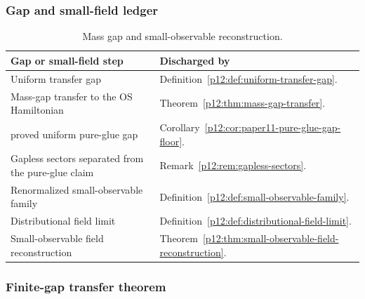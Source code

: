 \documentclass[12pt,a4paper]{article}
\begin{document}
\subsubsection{Gap and small-field ledger}
\label{p12:sec:gap-small-field-ledger}

\begin{table}[htbp]
\centering
\small
\begin{tabularx}{\textwidth}{@{}
>{\raggedright\arraybackslash}p{}
>{\raggedright\arraybackslash}X
@{}}
\toprule
\textbf{Gap or small-field step} & \textbf{Discharged by} \\
\midrule
Uniform transfer gap
& Definition~\ref{p12:def:uniform-transfer-gap}. \\

Mass-gap transfer to the OS Hamiltonian
& Theorem~\ref{p12:thm:mass-gap-transfer}. \\

proved uniform pure-glue gap
& Corollary~\ref{p12:cor:paper11-pure-glue-gap-floor}. \\

Gapless sectors separated from the pure-glue claim
& Remark~\ref{p12:rem:gapless-sectors}. \\

Renormalized small-observable family
& Definition~\ref{p12:def:small-observable-family}. \\

Distributional field limit
& Definition~\ref{p12:def:distributional-field-limit}. \\

Small-observable field reconstruction
& Theorem~\ref{p12:thm:small-observable-field-reconstruction}. \\
\bottomrule
\end{tabularx}
\caption[Mass gap and small-observable reconstruction]{Mass gap and small-observable reconstruction.}
\label{p12:tab:mass-gap-small-observable-ledger}
\label{p12:tab:gap-small-field-ledger}
\end{table}


\subsubsection{Finite-gap transfer theorem}
\label{p12:sec:uniform-transfer-gap}
\end{document}
